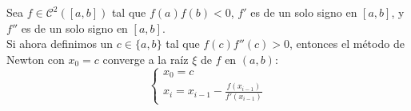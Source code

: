 \begin{teorema}
    Sea $f \in \mathcal{C}^2([a,b])$ tal que $f(a)f(b) < 0$, $f'$ es de un solo signo en $[a,b]$, y $f''$ es de un solo signo en $[a,b]$.\\
    Si ahora definimos un $c \in \{a,b\}$ tal que $f(c)f''(c) > 0$, entonces el método de Newton con $x_0 = c$ converge a la raíz $\xi$ de $f$ en $(a,b)$:
    \[
        \begin{cases}
            x_0 = c \\
            x_i = x_{i-1} - \frac{f(x_{i-1})}{f'(x_{i-1})}
        \end{cases}
    \]
\end{teorema}